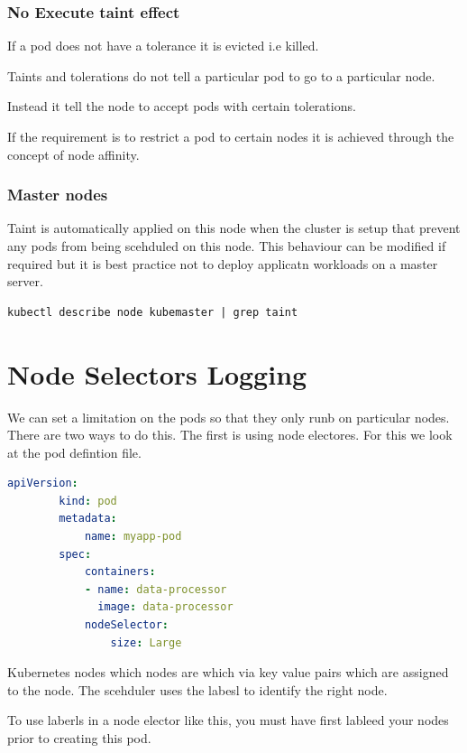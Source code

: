 \documentclass[11pt]{book}
\begin{document}
    \subsubsection{No Execute taint effect}
    If a pod does not have a tolerance it is evicted i.e killed.


    Taints and tolerations do not tell a particular pod to go to a particular node.

    Instead it tell the node to accept pods with certain tolerations.

    If the requirement is to restrict a pod to certain nodes it is achieved through the concept of node affinity.

    \subsubsection{Master nodes}
    Taint is automatically applied on this node when the cluster is setup that prevent any pods from being scehduled on this node.
    This behaviour can be modified if required but it is best practice not to deploy applicatn workloads on a master server.

    \begin{lstlisting}[language=terminal, caption={Commands}]
        kubectl describe node kubemaster | grep taint
    \end{lstlisting}


    \section{Node Selectors Logging}
    We can set a limitation on the pods so that they only runb on particular nodes.
    There are two ways to do this.
    The first is using node electores.
    For this we look at the pod defintion file.

    \begin{lstlisting}[language=yaml, caption={Node selector example}]
        apiVersion:
        kind: pod
        metadata:
            name: myapp-pod
        spec:
            containers:
            - name: data-processor
              image: data-processor
            nodeSelector:
                size: Large
    \end{lstlisting}

    Kubernetes nodes which nodes are which via key value pairs which are assigned to the node.
    The scehduler uses the labesl to identify the right node.

    To use laberls in a node elector like this, you must have first lableed your nodes prior to creating this pod.
\end{document}
